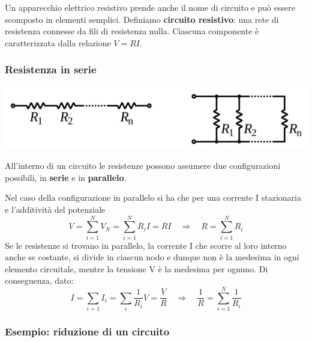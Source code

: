 Un apparecchio elettrico resistivo prende anche il nome di circuito e pu\`o essere scomposto in elementi semplici. Definiamo \textbf{circuito resistivo}: una rete di resistenza connesse da fili di resistenza nulla. Ciascuna componente \`e caratterizzata dalla relazione $V = RI$.

\subsubsection{Resistenza in serie }
\begin{center}
	\includegraphics[width = \textwidth]{images/resist_serie}
\end{center}
All'interno di un circuito le resistenze possono assumere due configurazioni possibili, in \textbf{serie} e in \textbf{parallelo}.

Nel caso della configurazione in parallelo si ha che per una corrente I stazionaria e l'additivit\`a del potenziale
\begin{equation*}
	V  = \sum_{i=1}^N V_{N} = \sum_{i=1}^{N} R_{i}I =RI \quad \Rightarrow \quad R = \sum_{i=1}^{N} R_{i}
\end{equation*}
Se le resistenze si trovano in parallelo, la corrente I che scorre al loro interno anche se costante, si divide in ciascun nodo e dunque non \`e la medesima in ogni elemento circuitale, mentre la tensione V \`e la medesima per ognuno. Di conseguenza, dato:
\begin{equation*}
	I = \sum_{i=1}I_i = \sum_{i} \frac{1}{R_{i}}V = \frac{V}{R} \quad \Rightarrow \quad \frac{1}{R} = \sum_{i=1}^{N} \frac{1}{R_{i}}
\end{equation*}
\newpage
\subsubsection{Esempio: riduzione di un circuito}

